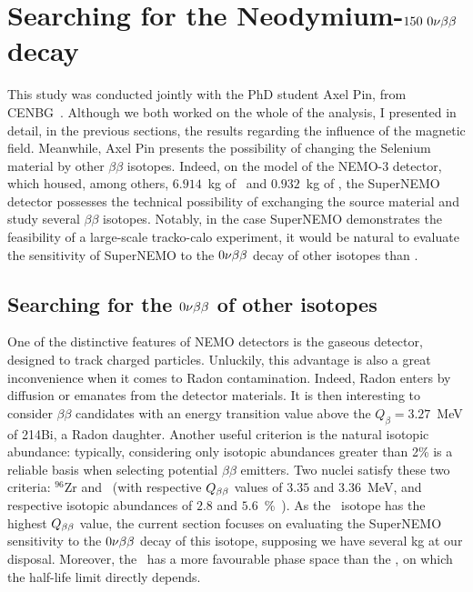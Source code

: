 \section{Searching for the Neodymium-$150~0\nu\beta\beta$ decay}
\label{sec:Nd}

This study was conducted jointly with the PhD student Axel Pin, from CENBG~\cite{AxelThesis}.
Although we both worked on the whole of the analysis, I presented in detail, in the previous sections, the results regarding the influence of the magnetic field.
Meanwhile, Axel Pin presents the possibility of changing the Selenium material by other $\beta\beta$ isotopes.
Indeed, on the model of the NEMO-$3$ detector, which housed, among others, $6.914$~kg of \Mo\ and $0.932$~kg of \Se, the SuperNEMO detector possesses the technical possibility of exchanging the source material and study several $\beta\beta$ isotopes.
Notably, in the case SuperNEMO demonstrates the feasibility of a large-scale tracko-calo experiment, it would be natural to  evaluate the sensitivity of SuperNEMO to the $0\nu\beta\beta$ decay of other isotopes than \Se.

\subsection{Searching for the $0\nu\beta\beta$ of other isotopes}

One of the distinctive features of NEMO detectors is the gaseous detector, designed to track charged particles.
Unluckily, this advantage is also a great inconvenience when it comes to Radon contamination.
Indeed, Radon enters by diffusion or emanates from the detector materials.
It is then interesting to consider $\beta\beta$ candidates with an energy transition value above the $Q_{\beta}=3.27$~MeV of 214Bi, a Radon daughter.
Another useful criterion is the natural isotopic abundance: typically, considering only isotopic abundances greater than 2\% is a reliable basis when selecting potential $\beta\beta$ emitters.
Two nuclei satisfy these two criteria: $^{96}$Zr and \Nd\ (with respective $Q_{\beta\beta}$ values of $3.35$ and $3.36$~MeV, and respective isotopic abundances of $2.8$ and $5.6$~\%~\cite{art:atomic_mass}).
As the \Nd\ isotope has the highest $Q_{\beta\beta}$ value, the current section focuses on evaluating the SuperNEMO sensitivity to the $0\nu\beta\beta$ decay of this isotope, supposing we have several kg at our disposal.
Moreover, the \Nd\ has a more favourable phase space than the \Se, on which the half-life limit directly depends.


